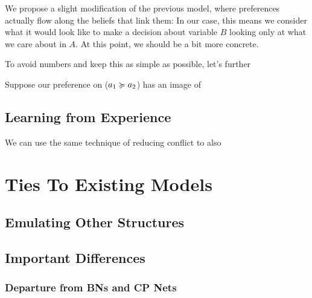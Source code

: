 \documentclass{article}
\begin{document}
	We propose a slight modification of the previous model, where preferences actually flow along the beliefs that link them: In our case, this means we consider what it would look like to make a decision about variable $B$ looking only at what we care about in $A$. At this point, we should be a bit more concrete. 

	To avoid numbers and keep this as simple as possible, let's further 
	
	Suppose our preference on ($a_1 \succcurlyeq a_2$) has an image of 
	\begin{center}
	\end{center}
	
	
	
	
	
	\subsection{Learning from Experience}
	
	We can use the same technique of reducing conflict to also 
	
	\section{Ties To Existing Models}
	
	\subsection{Emulating Other Structures}\label{sec:emulation}
	
	\subsection{Important Differences}
	
	\subsubsection{Departure from BNs and CP Nets}
	
\end{document}
